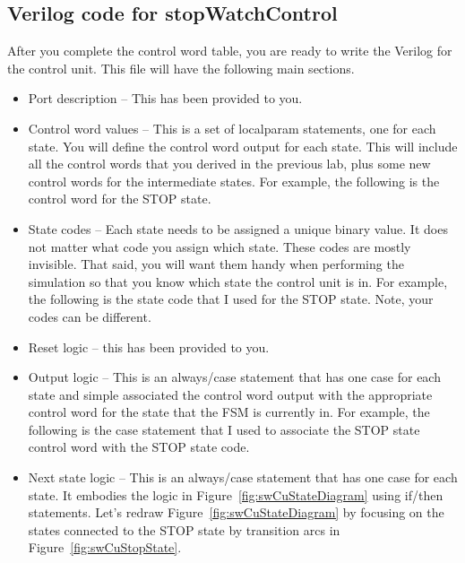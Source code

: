 \subsection{Verilog code for stopWatchControl}
\label{subsubsection:swCuVerilog}
After you complete the control word table, you are ready to write the
Verilog for the control unit. This file will have the following main
sections.

\begin{itemize}
\item
  Port description -- This has been provided to you.
\item
  Control word values -- This is a set of localparam statements, one for
  each state. You will define the control word output for each state.
  This will include all the control words that you derived in the
  previous lab, plus some new control words for the intermediate states.
  For example, the following is the control word for the STOP state.
\end{itemize}


\begin{itemize}
\item
  State codes -- Each state needs to be assigned a unique binary value.
  It does not matter what code you assign which state. These codes are
  mostly invisible. That said, you will want them handy when performing
  the simulation so that you know which state the control unit is in.
  For example, the following is the state code that I used for the STOP
  state. Note, your codes can be different.
\end{itemize}


\begin{itemize}
\item
  Reset logic -- this has been provided to you.
\item
  Output logic -- This is an always/case statement that has one case for
  each state and simple associated the control word output with the
  appropriate control word for the state that the FSM is currently in.
  For example, the following is the case statement that I used to
  associate the STOP state control word with the STOP state code.
\end{itemize}



\begin{itemize}
\item
  Next state logic -- This is an always/case statement that has one case
  for each state. It embodies the logic in Figure~\ref{fig:swCuStateDiagram} using if/then
  statements. Let's redraw Figure~\ref{fig:swCuStateDiagram} by focusing on the states connected
  to the STOP state by transition arcs in Figure~\ref{fig:swCuStopState}.
\end{itemize}


